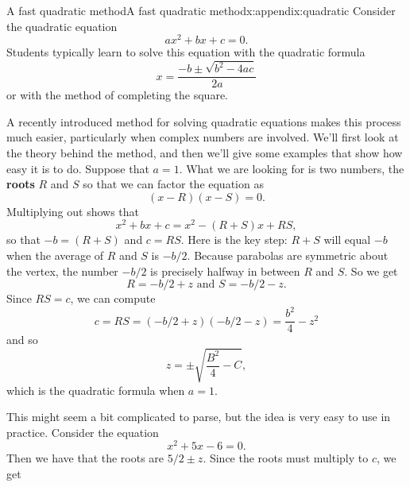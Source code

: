 \documentclass[oneside,10pt,]{book}
\newcommand{\terminology}[1]{\textbf{#1}}
\numberwithin{equation}{section}
\numberwithin{equation}{section}
\begin{document}
\begin{appendixptx}{A fast quadratic method}{}{A fast quadratic method}{}{}{x:appendix:quadratic}
Consider the quadratic equation%
\begin{equation*}
ax^2 + bx + c = 0.
\end{equation*}
Students typically learn to solve this equation with the quadratic formula%
\begin{equation*}
x = \frac{-b \pm \sqrt{b^2 - 4ac}}{2a}
\end{equation*}
or with the method of completing the square.%
\par
A recently introduced method for solving quadratic equations makes this process much easier, particularly when complex numbers are involved. We'll first look at the theory behind the method, and then we'll give some examples that show how easy it is to do. Suppose that \(a = 1\). What we are looking for is two numbers, the \terminology{roots} \(R\) and \(S\) so that we can factor the equation as%
\begin{equation*}
(x - R)(x - S) = 0.
\end{equation*}
Multiplying out shows that%
\begin{equation*}
x^2 + bx + c = x^2 -(R +S)x + RS,
\end{equation*}
so that \(-b = (R + S)\) and \(c = RS\). Here is the key step: \(R+S\) will equal \(-b\) when the average of \(R\) and \(S\) is \(-b/2\). Because parabolas are symmetric about the vertex, the number \(-b/2\) is precisely halfway in between \(R\) and \(S\). So we get%
\begin{equation*}
R = -b/2 + z \text{ and } S = -b/2 - z.
\end{equation*}
Since \(RS = c\), we can compute%
\begin{equation*}
c = RS = (-b/2 + z)(-b/2 - z) = \frac{b^2}{4} - z^2
\end{equation*}
and so%
\begin{equation*}
z = \pm\sqrt{\frac{B^2}{4} - C},
\end{equation*}
which is the quadratic formula when \(a = 1\).%
\par
This might seem a bit complicated to parse, but the idea is very easy to use in practice. Consider the equation%
\begin{equation*}
x^2 + 5x - 6 = 0.
\end{equation*}
Then we have that the roots are \(5/2 \pm z\). Since the roots must multiply to \(c\), we get%
\begin{gather*}

\end{gather*}
\end{appendixptx}
\end{document}
